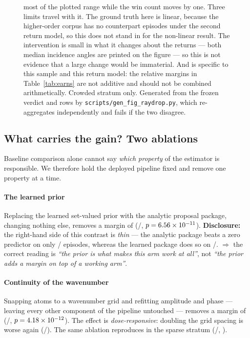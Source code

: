 \documentclass[review]{elsarticle}
\begin{document}
\begin{figure}[!htbp]
{most of the plotted range while the win count moves by one.
Three limits travel with it. The ground truth here is linear, because the
higher-order corpus has no counterpart episodes under the second return model, so
this does not stand in for the non-linear result. The intervention is small in what
it changes about the returns --- both median incidence angles are printed on the
figure --- so this is not evidence that a large change would be immaterial. And
\BFifteenRel{} is specific to this sample and this return model: the relative
margins in Table~\ref{tab:earns} are not additive and should not be combined
arithmetically. Crowded stratum only. Generated from the frozen verdict and rows by
\texttt{scripts/gen\_fig\_raydrop.py}, which re-aggregates independently and fails
if the two disagree.}
\label{fig:raydrop}
\end{figure}

\subsection{What carries the gain? Two ablations}
\label{sec:res_ablation}

Baseline comparison alone cannot say \emph{which property} of the estimator is
responsible. We therefore hold the deployed pipeline fixed and remove one property
at a time.

\paragraph{The learned prior}
Replacing the learned set-valued prior with the analytic proposal package, changing
nothing else, removes a margin of \BTwentyTwoRel{} (\BTwentyTwoBetter{}/\BTwentyTwoN{},
$p = 6.56\times 10^{-11}{}$).
\textbf{Disclosure:} the right-hand side of this contrast is \emph{thin} --- the
analytic package beats a zero predictor on only \BTwentyTwoAnaZero{}/\BTwentyTwoN{}
episodes, whereas the learned package does so on \BTwentyTwoLearnZero{}/\BTwentyTwoN{}.
$\Rightarrow$ the correct reading is \emph{``the prior is what makes this arm work at all''},
not \emph{``the prior adds a margin on top of a working arm''}.

\paragraph{Continuity of the wavenumber}
Snapping atoms to a wavenumber grid and refitting amplitude and phase --- leaving
every other component of the pipeline untouched --- removes a margin of \BSixteenRel{}
(\BSixteenBetter{}/\BSixteenN{}, $p = 4.18\times 10^{-12}{}$). The effect is
\emph{dose-responsive}: doubling the grid spacing is worse again
(\BSixteenDose{}/\BSixteenN{}). The same ablation reproduces in the sparse stratum
(\BNineteenBetter{}/\BNineteenN{}, \BNineteenRel{}).
\end{document}
